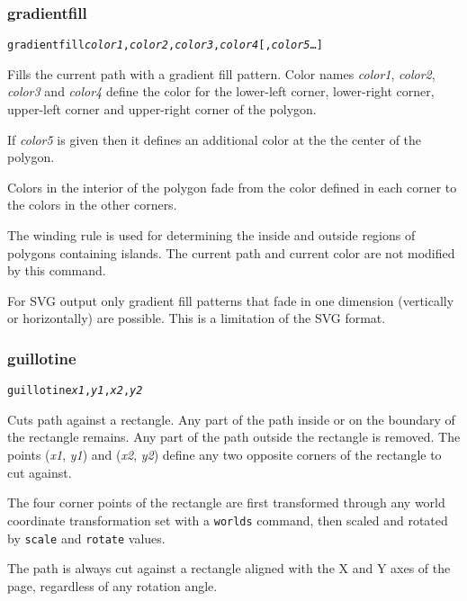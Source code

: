 \subsubsection{gradientfill}

\begin{alltt}
gradientfill \textit{color1}, \textit{color2}, \textit{color3}, \textit{color4} [, \textit{color5} \ldots]
\end{alltt}

Fills the current path with a gradient fill pattern.
Color names \textit{color1}, \textit{color2}, \textit{color3} and
\textit{color4} define the color for the lower-left corner,
lower-right corner, upper-left corner and upper-right corner of
the polygon.

If \textit{color5} is given then it defines an additional color at the
the center of the polygon.

Colors in the interior of the polygon fade from the color defined
in each corner to the colors in the other corners.

The winding rule is used for determining the inside and outside
regions of polygons containing islands.
The current path and current color are not modified by this command.

For SVG output only gradient fill patterns that fade in one dimension
(vertically or horizontally) are possible.  This is a limitation
of the SVG format.

\subsubsection{guillotine}

\begin{alltt}
guillotine \textit{x1}, \textit{y1}, \textit{x2}, \textit{y2}
\end{alltt}

Cuts path against a rectangle.
Any part of the path inside or
on the boundary of the rectangle remains.
Any part of the path outside the rectangle is removed.
The points
(\textit{x1}, \textit{y1}) and (\textit{x2}, \textit{y2}) define
any two opposite corners of the rectangle to cut against.

The four corner points of the rectangle
are first transformed through any world coordinate
transformation set with a \texttt{worlds} command,
then scaled and rotated by \texttt{scale}
and \texttt{rotate} values.

The path is always cut against a rectangle
aligned with the X and Y axes of the page, regardless of any rotation angle.


